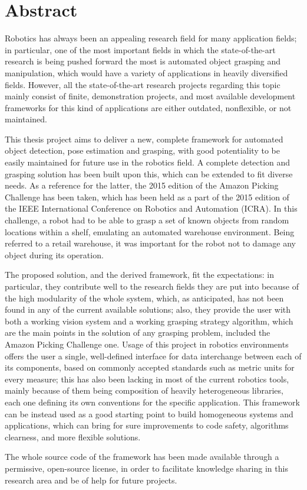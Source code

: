\chapter*{Abstract}
Robotics has always been an appealing research field for many
application fields; in particular, one of the most
important fields in which the state-of-the-art research is being
pushed forward the most is automated object grasping and manipulation,
which would have a variety of applications in heavily diversified
fields. However,  all the state-of-the-art research projects regarding
this topic mainly consist of finite, demonstration projects, and most
available development frameworks for this kind of applications are
either outdated, nonflexible, or not maintained.

This thesis project aims to deliver a new, complete framework for
automated object detection, pose estimation and grasping, with good
potentiality to be easily maintained for future use in the robotics
field. A complete detection and grasping solution has been built upon
this, which can be extended to fit diverse needs. As a reference for
the latter, the 2015 edition of the Amazon Picking Challenge has been
taken, which has been held as a part of the 2015 edition of the IEEE
International Conference on Robotics and Automation (ICRA). In this
challenge, a robot had to be able to grasp a set of known objects from
random locations within a shelf, emulating an automated warehouse
environment. Being referred to a retail warehouse, it was important
for the robot not to damage any object during its operation.

The proposed solution, and the derived framework, fit the
expectations: in particular, they contribute well to the research
fields they are put into because of the high modularity of the whole
system, which, as anticipated, has not been found in any of the
current available solutions; also, they provide the user with both a
working vision system and a working grasping strategy algorithm, which
are the main points in the solution of any grasping problem, included
the Amazon Picking Challenge one. Usage of this project in robotics
environments offers the user a single, well-defined interface for data
interchange between each of its components, based on commonly accepted
standards such as metric units for every measure; this has also been
lacking in most of the current robotics tools, mainly because of them
being composition of heavily heterogeneous libraries, each one
defining its own conventions for the specific application. This
framework can be instead used as a good starting point to build
homogeneous systems and applications, which can bring for sure
improvements to code safety, algorithms clearness, and more flexible
solutions.

The whole source code of the framework has been made available through
a permissive, open-source license, in order to facilitate knowledge
sharing in this research area and be of help for future projects.
